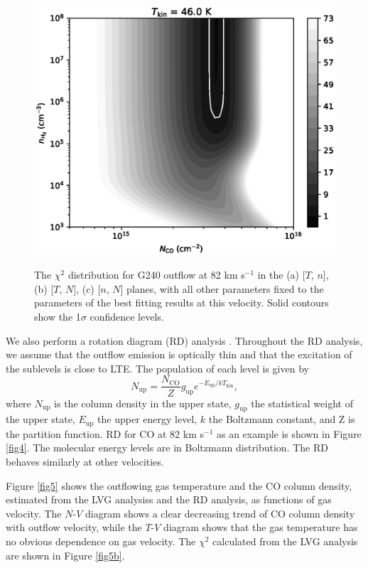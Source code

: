 \begin{figure}[tbp]
{\begin{minipage}[b]{0.5\textwidth}
\includegraphics[width=1\textwidth]{./fig/chiimage_tkin_paper.eps}
\label{fig3c}
\end{minipage}
}
\caption{The $\chi^2$ distribution for G240 outflow at 82 km s$^{-1}$ in the (a) [$T$, $n$], (b) [$T$, $N$], (c) [$n$, $N$] planes, with all other parameters fixed to the parameters of the best fitting results at this velocity. Solid contours show the 1$\sigma$ confidence levels. \label{fig3}}
\end{figure}

We also perform a rotation diagram (RD) analysis \citep{1999ApJ...517..209G}. Throughout the RD analysis, we assume that the outflow emission is optically thin and that the excitation of the sublevels is close to  LTE. The population of each level is given by 
\begin{equation}
N_{\mathrm{up}} = \frac{N_\mathrm{CO}}{Z} g_\mathrm{up} e^{-E_\mathrm{up}/kT_\mathrm{kin}},
\end{equation}
where $N_\mathrm{up}$ is the column density in the upper state, $g_\mathrm{up}$ the statistical weight of the upper state, $E_\mathrm{up}$ the upper energy level, $k$ the Boltzmann constant, and Z is the partition function.
RD for CO at 82 km s$^{-1}$ as an example is shown in Figure \ref{fig4}. The molecular energy levels are in Boltzmann distribution. The RD behaves similarly at other velocities. 

Figure \ref{fig5} shows the outflowing gas temperature and the CO column density, estimated from the LVG analysiss and the RD analysis, as functions of gas velocity. The $N$-$V$ diagram shows a clear decreasing trend of CO column density with outflow velocity, while the $T$-$V$ diagram shows that the gas temperature has no obvious dependence on gas velocity. The $\chi^2$ calculated from the LVG analysis are shown in Figure \ref{fig5b}.

